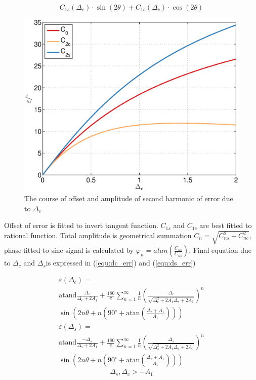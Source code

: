 \documentclass[a4paper]{article}
\begin{document}
\begin{equation}
C_{1s}(\Delta_c) \cdot\sin(2\theta)+C_{1c}(\Delta_c) \cdot\cos(2\theta)
\end{equation}

\begin{figure}[!htb]
	\begin{center}
		\includegraphics[width=\linewidth]{./Slike/dc.eps}
		\caption{The course of offset and amplitude of second harmonic of error due to $\Delta_{c}$} \label{fig:dc}
	\end{center}
\end{figure}

Offset of error is fitted to invert tangent function. $C_{1s}$ and $C_{1c}$ are best fitted to rational function. Total amplitude is geometrical summation $C_n = \sqrt{C_{ns}^2+C_{nc}^2}$, phase fitted to sine signal is calculated by  $\varphi_{n} = atan(\frac{C_{nc}}{C_{ns}})$.
Final equation due to $\Delta_c$ and $\Delta_s$is expressed in (\ref{equ:dc_err}) and (\ref{equ:ds_err})

\begin{multline}
\label{equ:dc_err}
\varepsilon(\Delta_c) =\\ \mathrm{atand}\frac{\Delta_c}{\Delta_c+2 A_1}+\frac{180}{\pi} \sum_{n=1}^{\infty}\frac{1}{n} (\frac{\Delta_c}{\sqrt{\Delta_c^2+2 A_1 \Delta_c+2 A_1}})^n\\ \sin (2n \theta+n (90^\circ+ \mathrm{ atan}(\frac{\Delta_c+A_1}{A_1})))
\end{multline}
\begin{multline}
\label{equ:ds_err}
\varepsilon(\Delta_s) =\\ \mathrm{atand}\frac{-\Delta_s}{\Delta_s+2 A_1}+\frac{180}{\pi} \sum_{n=1}^{\infty}\frac{1}{n} (\frac{\Delta_s}{\sqrt{\Delta_s^2+2 A_1 \Delta_s+2A_1}})^n\\ \sin (2n \theta+n (90^\circ+ \mathrm{ atan}(\frac{\Delta_s+A_1}{A_1})))
\end{multline}
\begin{equation*}
\Delta_s, \Delta_c > -A_1
\end{equation*}
\end{document}
